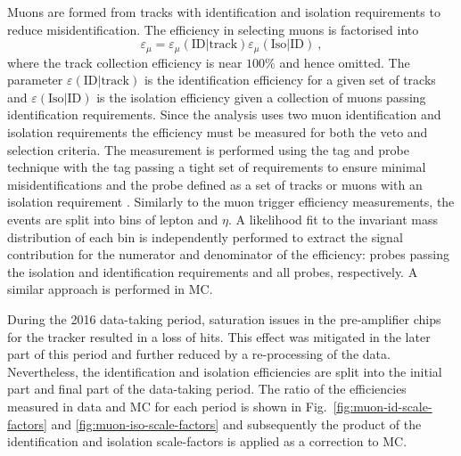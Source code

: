 Muons are formed from tracks with identification and isolation requirements to reduce misidentification. The efficiency in selecting muons is factorised into
%
\begin{equation}
    \varepsilon_{\mu} = \varepsilon_{\mu}(\mathrm{ID}|\mathrm{track}) \varepsilon_{\mu}(\mathrm{Iso}|\mathrm{ID})\ ,
\end{equation}
%
where the track collection efficiency is near $100\%$ and hence omitted. The parameter $\varepsilon(\mathrm{ID}|\mathrm{track})$ is the identification efficiency for a given set of tracks and $\varepsilon(\mathrm{Iso}|\mathrm{ID})$ is the isolation efficiency given a collection of muons passing identification requirements. Since the analysis uses two muon identification and isolation requirements the efficiency must be measured for both the veto and selection criteria. The measurement is performed using the tag and probe technique with the tag passing a tight set of requirements to ensure minimal misidentifications and the probe defined as a set of tracks or muons with an isolation requirement \cite{CMS-DP-2017-007}. Similarly to the muon trigger efficiency measurements, the events are split into bins of lepton \pt and $\eta$. A likelihood fit to the invariant mass distribution of each bin is independently performed to extract the signal contribution for the numerator and denominator of the efficiency: probes passing the isolation and identification requirements and all probes, respectively. A similar approach is performed in MC. %

During the 2016 data-taking period, saturation issues in the pre-amplifier chips for the tracker resulted in a loss of hits. This effect was mitigated in the later part of this period and further reduced by a re-processing of the data. Nevertheless, the identification and isolation efficiencies are split into the initial part and final part of the data-taking period. The ratio of the efficiencies measured in data and MC for each period is shown in Fig.~\ref{fig:muon-id-scale-factors} and \ref{fig:muon-iso-scale-factors} and subsequently the product of the identification and isolation scale-factors is applied as a correction to MC.


